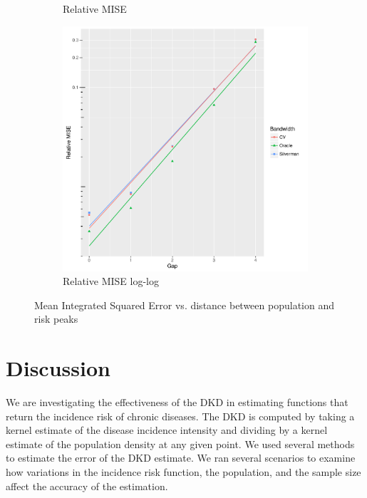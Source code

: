 \begin{figure}[htbp]
\begin{subfigure}[b]{0.3\textwidth}
    \caption{Relative MISE}
    \end{subfigure}
    \begin{subfigure}[b]{0.3\textwidth}
    \includegraphics[width=\textwidth]{results/by_pop_risk_distance/RMISE-vs-population-risk-gap-log-log}
    \caption{Relative MISE log-log}
    \end{subfigure}
    \caption[MISE: by risk decay]{Mean Integrated Squared Error vs. distance between population and risk peaks}
    \label{fig:ise:p1.4_Gap_risk}
\end{figure}


\section{Discussion}
\label{sec:discussion}

We are investigating the effectiveness of the DKD in estimating functions that return the incidence risk of chronic diseases. 
The DKD is computed by taking a kernel estimate of the disease incidence intensity and dividing by a kernel estimate of the population density at any given point.
We used several methods to estimate the error of the DKD estimate.
We ran several scenarios to examine how variations in the incidence risk function, the population, and the sample size affect the accuracy of the estimation. 


